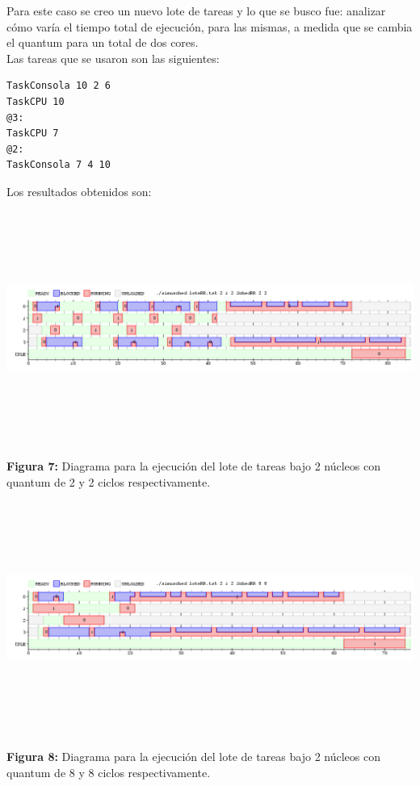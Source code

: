 \documentclass[a4paper]{article}
\begin{document}
 Para este caso se creo un nuevo lote de tareas y lo que se busco fue: analizar c\'omo varía el tiempo total de ejecución, para las mismas, a medida que se cambia el quantum para un total de dos cores.\\
 
 Las tareas que se usaron son las siguientes:\\
 \begin{codesnippet}
	\begin{verbatim}
TaskConsola 10 2 6
TaskCPU 10
@3:
TaskCPU 7
@2:
TaskConsola 7 4 10
	\end{verbatim}
	\end{codesnippet}

Los resultados obtenidos son:

 \includegraphics[width=\textwidth,height=3.0in,keepaspectratio]{imagenes/ej4/eje1.png} \\
\begin {flushleft}
\textbf{Figura 7:} Diagrama para la ejecuci\'on del lote de tareas bajo 2 n\'ucleos con quantum de 2 y 2 ciclos respectivamente.
\end{flushleft}

 \includegraphics[width=\textwidth,height=3.0in,keepaspectratio]{imagenes/ej4/eje2.png} \\
\begin {flushleft}
\textbf{Figura 8:} Diagrama para la ejecuci\'on del lote de tareas bajo 2 n\'ucleos con quantum de 8 y 8 ciclos respectivamente.
\end{flushleft}
\end{document}
